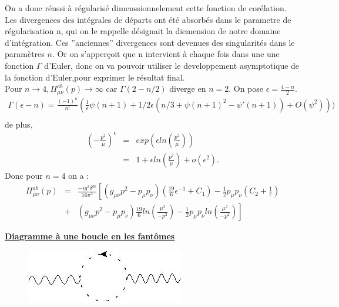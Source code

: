 \documentclass[a4paper,11pt]{article}
\theoremstyle{plain}
\theoremstyle{definition}
\theoremstyle{remark}
\numberwithin{equation}{section}
\numberwithin{equation}{subsection}
\numberwithin{figure}{section}
\begin{document}
On a donc réussi à régularisé dimenssionnelement cette fonction de corélation. Les divergences des intégrales de départs ont été 
absorbés dans le parametre de régularisation n, qui on le rappelle désignait la diemension de notre domaine d'intégration. Ces ''anciennes'' 
divergences sont devenues des singularités dans le paramètres $n$. Or on s'apperçoit que n intervient à chaque fois dans une une 
fonction $\Gamma$ d'Euler, donc on va pouvoir utiliser le developpement asymptotique de la fonction d'Euler,pour exprimer le résultat final.\\
Pour $n \rightarrow 4 , \Pi^{ab}_{\mu\nu}(p) \rightarrow \infty$ car $ \Gamma(2-n/2)$ diverge en $n=2$.
On pose $\epsilon = \frac{4-n}{2}$.
\begin{eqnarray}
 \Gamma(\epsilon-n) = \frac{(-1)^{n}}{n!} ( \frac{1}{\epsilon} \psi(n+1) + 1/2 \epsilon(n/3 + \psi(n+1)^2 - \psi'(n+1))+ O(\psi^{2}))) \nonumber  \\
\end{eqnarray}
de plus,
\begin{eqnarray}
 \left(-\frac{p^2}{\mu}\right)^{\epsilon} &=& exp(\epsilon ln(\frac{p^2}{\mu}) )  \nonumber \\
                                          &=& 1+\epsilon ln(\frac{p^2}{\mu}) + o(\epsilon^{2}).
\end{eqnarray}
Donc pour $n=4$ on a :
\begin{eqnarray}
\Pi^{ab}_{\mu\nu}(p) &=& \frac{-i g^2 \delta^{ab}}{16 \pi^{2}} \left[
\left( g_{\mu\nu}p^2 - p_{\mu}p_{\nu} \right) \left( \frac{19}{6} \epsilon^{-1} + C_1 \right)
- \frac{1}{2} p_{\mu} p_{\nu} ( C_2 + \frac{1}{\epsilon} ) \right.  \nonumber  \\ 
    &+& \left. \left( g_{\mu \nu} p^2 - p_{\mu} p_{\nu} \right) \frac{19}{6} ln(\frac{\mu^2}{-p^2})
-\frac{1}{2} p_{\mu} p_{\nu}  ln( \frac{\mu^2}{- p^2} ) \right]
\end{eqnarray}  

\noindent
\underline{\textbf{Diagramme à une boucle en les fantômes}}

\begin{figure}[H]
 \begin{center}
  \includegraphics[scale=0.4]{1_loop_2_vert_CCA.jpg}
 \end{center}
\end{figure}
\end{document}
